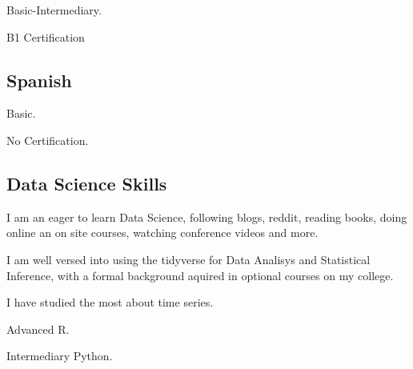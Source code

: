 \documentclass[11pt, a4paper]{awesome-cv}
\begin{document}
Basic-Intermediary.

B1 Certification

\hypertarget{spanish}{%
\subsection{Spanish}\label{spanish}}

Basic.

No Certification.

\hypertarget{data-science-skills}{%
\subsection{Data Science Skills}\label{data-science-skills}}

I am an eager to learn Data Science, following blogs, reddit, reading books, doing online an on site courses, watching conference videos and more.

I am well versed into using the tidyverse for Data Analisys and Statistical Inference, with a formal background aquired in optional courses on my college.

I have studied the most about time series.

Advanced R.

Intermediary Python.
\end{document}

